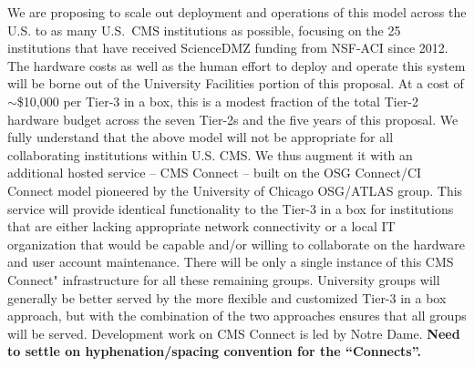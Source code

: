 \documentclass[11pt,a4paper]{article}
\begin{document}
We are proposing to scale out deployment and operations of this model
across the U.S. to as many U.S.~CMS institutions as possible, focusing on
the 25 institutions that have received ScienceDMZ funding from NSF-ACI
since 2012. The hardware costs as well as the human effort to deploy and
operate this system will be borne out of the University Facilities portion
of this proposal.  At a cost of $\sim$\$10,000 per Tier-3 in a box, this is
a modest fraction of the total Tier-2 hardware budget across the seven
Tier-2s and the five years of this proposal.  We fully understand that the
above model will not be appropriate for all collaborating institutions
within U.S. CMS. We thus augment it with an additional hosted service -- CMS
Connect -- built on the OSG Connect/CI Connect model pioneered by the
University of Chicago OSG/ATLAS group.  This service will provide identical
functionality to the Tier-3 in a box for institutions that are either
lacking appropriate network connectivity or a local IT organization that
would be capable and/or willing to collaborate on the hardware and user
account maintenance.  There will be only a single instance of this
CMS Connect" infrastructure for all these remaining groups.  University
groups will generally be better served by the more flexible and customized
Tier-3 in a box approach, but with the combination of the two approaches
ensures that all groups will be served.  Development work on CMS Connect is
led by Notre Dame.  {\bf Need to settle on
  hyphenation/spacing convention for the ``Connects''.}
\end{document}
